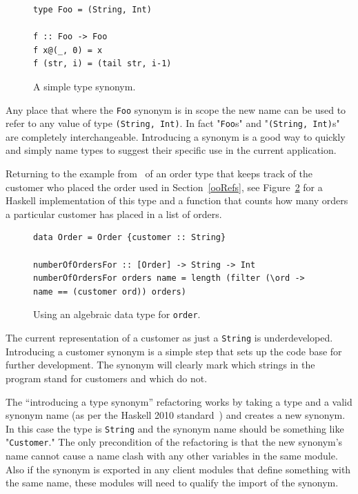 \begin{figure}[t]
	\begin{lstlisting}
type Foo = (String, Int)

f :: Foo -> Foo
f x@(_, 0) = x
f (str, i) = (tail str, i-1) 
	\end{lstlisting}
	\caption{A simple type synonym.}\label{fooSyn}
\end{figure}

Any place that where the \texttt{Foo} synonym is in scope the new name can be used to refer to any value of type \texttt{(String, Int)}. In fact "\texttt{Foo}s" and "\texttt{(String, Int)}s" are completely interchangeable. Introducing a synonym is a good way to quickly and simply name types to suggest their specific use in the current application.

Returning to the example from~\citep{fowler} of an order type that keeps track of the customer who placed the order used in Section~\ref{ooRefs}, see Figure~\ref{haskellOrder} for a Haskell implementation of this type and a function that counts how many orders a particular customer has placed in a list of orders.

\begin{figure}
	\begin{lstlisting}
data Order = Order {customer :: String}

numberOfOrdersFor :: [Order] -> String -> Int
numberOfOrdersFor orders name = length (filter (\ord -> name == (customer ord)) orders)
	\end{lstlisting}
	\caption{Using an algebraic data type for \texttt{order}.}
	\label{haskellOrder}
\end{figure}

The current representation of a customer as just a \texttt{String} is underdeveloped. Introducing a customer synonym is a simple step that sets up the code base for further development. The synonym will clearly mark which strings in the program stand for customers and which do not.

The ``introducing a type synonym'' refactoring works by taking a type and a valid synonym name (as per the Haskell 2010 standard~\citep{haskell2010}) and creates a new synonym. In this case the type is \texttt{String} and the synonym name should be something like "\texttt{Customer}." The only precondition of the refactoring is that the new synonym's name cannot cause a name clash with any other variables in the same module. Also if the synonym is exported in any client modules that define something with the same name, these modules will need to qualify the import of the synonym. 

